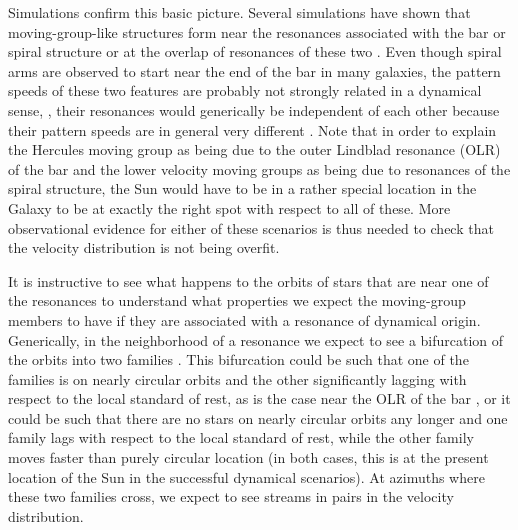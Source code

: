 Simulations confirm this basic picture. Several simulations have shown
that moving-group-like structures form near the resonances associated
with the bar \citep[\eg,][]{dehnen00a,fux01a} or spiral structure
\citep{Quillen05a} or at the overlap of resonances of these two
\citep{Quillen03a}. Even though spiral arms are observed to start near
the end of the bar in many galaxies, the pattern speeds of these two
features are probably not strongly related in a dynamical sense, \ie,
their resonances would generically be independent of each other
because their pattern speeds are in general very different
\citep{Sellwood88a}. Note that in order to explain the Hercules moving
group as being due to the outer Lindblad resonance (OLR) of the bar
and the lower velocity moving groups as being due to resonances of the
spiral structure, the Sun would have to be in a rather special
location in the Galaxy to be at exactly the right spot with respect to
all of these. More observational evidence for either of these
scenarios is thus needed to check that the velocity distribution is
not being overfit.

It is instructive to see what happens to the orbits of stars that are
near one of the resonances to understand what properties we expect the
moving-group members to have if they are associated with a resonance
of dynamical origin. Generically, in the neighborhood of a resonance
we expect to see a bifurcation of the orbits into two families
\citep{Contopoulos75a,Weinberg94a,Kalnajs91a}. This bifurcation could
be such that one of the families is on nearly circular orbits and the
other significantly lagging with respect to the local standard of
rest, as is the case near the OLR of the bar \citep{dehnen00a}, or it
could be such that there are no stars on nearly circular orbits any
longer and one family lags with respect to the local standard of rest,
while the other family moves faster than purely circular location (in
both cases, this is at the present location of the Sun in the
successful dynamical scenarios). At azimuths where these two families
cross, we expect to see streams in pairs in the velocity distribution.


